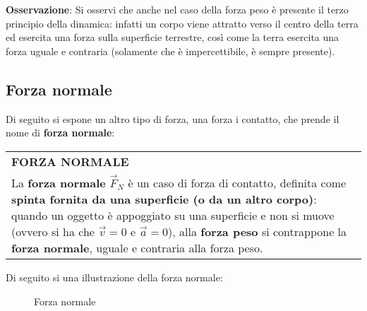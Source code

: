\documentclass[a4paper]{extarticle}
\renewcommand\arraystretch{}
\begin{document}
\vspace{1em}
\noindent
\textbf{Osservazione}: Si osservi che anche nel caso della forza peso è presente il terzo principio della dinamica: infatti un corpo viene attratto verso il centro della terra ed esercita una forza sulla superficie terrestre, così come la terra esercita una forza uguale e contraria (solamente che è impercettibile, è sempre presente).

\vspace{1em}
\subsection{Forza normale}
Di seguito si espone un altro tipo di forza, una forza i contatto, che prende il nome di \textbf{forza normale}:

\vspace{1em}
\setlength{\tabcolsep}{14pt}
\renewcommand{\arraystretch}{2}
\noindent
\begin{tabularx}{\textwidth}{@{}|P|@{}}
    \hline
    {\textbf{FORZA NORMALE}}\\
    \parbox{\linewidth}{La \textbf{forza normale} $\vec{F}_N$ è un caso di forza di contatto, definita come \textbf{spinta fornita da una superficie (o da un altro corpo)}: quando un oggetto è appoggiato su una superficie e non si muove (ovvero si ha che $\vec{v}=0$ e $\vec{a}=0$), alla \textbf{forza peso} si contrappone la \textbf{forza normale}, uguale e contraria alla forza peso.
    \vspace{3mm}}\\
    \hline
\end{tabularx}

\vspace{1em}
\noindent
Di seguito si una illustrazione della forza normale:

\vspace{1em}
\begin{figure}[H]
  \centering
  \caption{Forza normale}
  \label{fig:forza_normale}
\end{figure}
\end{document}

